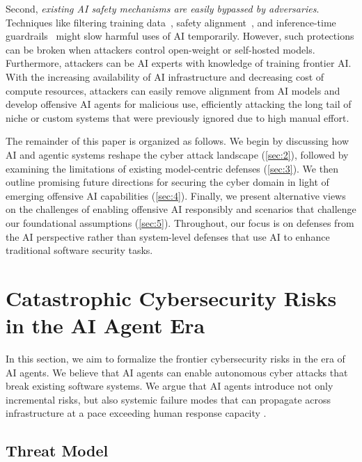 \documentclass{article}
\theoremstyle{plain}
\theoremstyle{definition}
\theoremstyle{remark}
\begin{document}
Second, \textit{existing AI safety mechanisms are easily bypassed by adversaries}. Techniques like filtering training data~\citep{schmitt2025cyber}, safety alignment~\citep{kenton2021alignment, openai_superalignment}, and inference-time guardrails~\citep{rebedea2023nemo} might slow harmful uses of AI temporarily. However, such protections can be broken when attackers control open-weight or self-hosted models. Furthermore, attackers can be AI experts with knowledge of training frontier AI. With the increasing availability of AI infrastructure and decreasing cost of compute resources, attackers can easily remove alignment from AI models and develop offensive AI agents for malicious use, efficiently attacking the long tail of niche or custom systems that were previously ignored due to high manual effort.




The remainder of this paper is organized as follows. We begin by discussing how AI and agentic systems reshape the cyber attack landscape (\autoref{sec:2}), followed by examining the limitations of existing model-centric defenses (\autoref{sec:3}). We then outline promising future directions for securing the cyber domain in light of emerging offensive AI capabilities (\autoref{sec:4}). Finally, we present alternative views on the challenges of enabling offensive AI responsibly and scenarios that challenge our foundational assumptions (\autoref{sec:5}). Throughout, our focus is on defenses from the AI perspective rather than system-level defenses that use AI to enhance traditional software security tasks.



\section{Catastrophic Cybersecurity Risks in the AI Agent Era}
\label{sec:2}


In this section, we aim to formalize the frontier cybersecurity risks in the era of AI agents. We believe that AI agents can enable autonomous cyber attacks that break existing software systems. We argue that AI agents introduce not only incremental risks, but also systemic failure modes that can propagate across infrastructure at a pace exceeding human response capacity \citep{xbow_pentester}.


\subsection{Threat Model}
\end{document}
